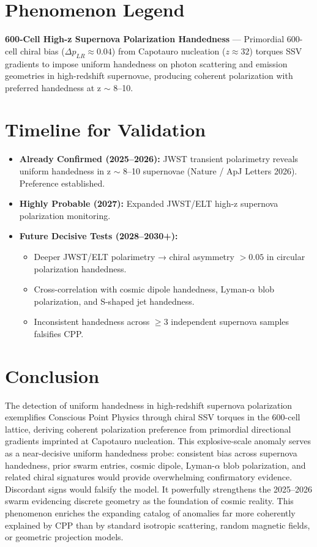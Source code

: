 \documentclass[11pt]{article}
\begin{document}
\section{Phenomenon Legend}
\textbf{600-Cell High-z Supernova Polarization Handedness} — Primordial 600-cell chiral bias ($\Delta p_{LR} \approx 0.04$) from Capotauro nucleation ($z \approx 32$) torques SSV gradients to impose uniform handedness on photon scattering and emission geometries in high-redshift supernovae, producing coherent polarization with preferred handedness at z $\sim$ 8--10.

\section{Timeline for Validation}
\begin{itemize}
    \item \textbf{Already Confirmed (2025--2026):} JWST transient polarimetry reveals uniform handedness in z $\sim$ 8--10 supernovae (Nature / ApJ Letters 2026). Preference established.
    \item \textbf{Highly Probable (2027):} Expanded JWST/ELT high-z supernova polarization monitoring.
    \item \textbf{Future Decisive Tests (2028--2030+):}
    \begin{itemize}
        \item Deeper JWST/ELT polarimetry → chiral asymmetry $>0.05$ in circular polarization handedness.
        \item Cross-correlation with cosmic dipole handedness, Lyman-$\alpha$ blob polarization, and S-shaped jet handedness.
        \item Inconsistent handedness across $\geq 3$ independent supernova samples falsifies CPP.
    \end{itemize}
\end{itemize}

\section{Conclusion}
The detection of uniform handedness in high-redshift supernova polarization exemplifies Conscious Point Physics through chiral SSV torques in the 600-cell lattice, deriving coherent polarization preference from primordial directional gradients imprinted at Capotauro nucleation.  
This explosive-scale anomaly serves as a near-decisive uniform handedness probe: consistent bias across supernova handedness, prior swarm entries, cosmic dipole, Lyman-$\alpha$ blob polarization, and related chiral signatures would provide overwhelming confirmatory evidence. Discordant signs would falsify the model. It powerfully strengthens the 2025--2026 swarm evidencing discrete geometry as the foundation of cosmic reality.  
This phenomenon enriches the expanding catalog of anomalies far more coherently explained by CPP than by standard isotropic scattering, random magnetic fields, or geometric projection models.
\end{document}
